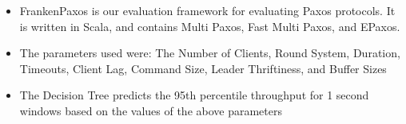 \begin{itemize}
    \item FrankenPaxos is our evaluation framework for evaluating Paxos protocols. It is written in Scala, and
    contains Multi Paxos, Fast Multi Paxos, and EPaxos.
    \item The parameters used were: The Number of Clients, Round System, Duration, Timeouts, Client Lag,
    Command Size, Leader Thriftiness, and Buffer Sizes
    \item The Decision Tree predicts the 95th percentile throughput for 1 second windows based on the values
    of the above parameters
\end{itemize}
